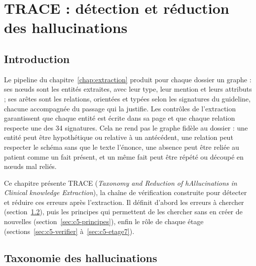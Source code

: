 \chapter{TRACE : détection et réduction des hallucinations}
\label{chap:architecture}

\section{Introduction}\label{sec:c5-intro}

Le pipeline du chapitre~\ref{chap:extraction} produit pour chaque dossier un graphe : ses nœuds sont les entités extraites, avec leur type, leur mention et leurs attributs ; ses arêtes sont les relations, orientées et typées selon les signatures du guideline, chacune accompagnée du passage qui la justifie. Les contrôles de l'extraction garantissent que chaque entité est écrite dans sa page et que chaque relation respecte une des 34 signatures. Cela ne rend pas le graphe fidèle au dossier : une entité peut être hypothétique ou relative à un antécédent, une relation peut respecter le schéma sans que le texte l'énonce, une absence peut être reliée au patient comme un fait présent, et un même fait peut être répété ou découpé en nœuds mal reliés.

Ce chapitre présente TRACE (\textit{Taxonomy and Reduction of hAllucinations in Clinical knowledge Extraction}), la chaîne de vérification construite pour détecter et réduire ces erreurs après l'extraction. Il définit d'abord les erreurs à chercher (section~\ref{sec:c5-taxonomie}), puis les principes qui permettent de les chercher sans en créer de nouvelles (section~\ref{sec:c5-principes}), enfin le rôle de chaque étage (sections~\ref{sec:c5-verifier} à~\ref{sec:c5-etage7}).

\section{Taxonomie des hallucinations}\label{sec:c5-taxonomie}

